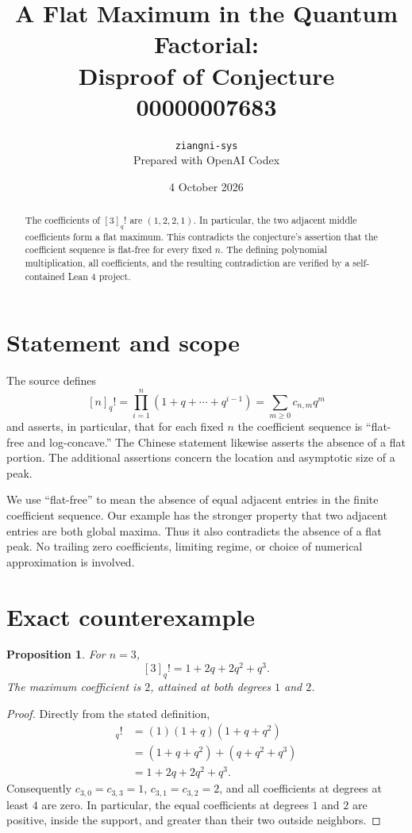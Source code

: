 \documentclass[11pt]{article}
\title{A Flat Maximum in the Quantum Factorial:\\Disproof of Conjecture 00000007683}
\author{\texttt{ziangni-sys}\\\small Prepared with OpenAI Codex}
\date{4 October 2026}
\newtheorem{proposition}{Proposition}
\begin{document}
\maketitle

\begin{abstract}
The coefficients of $[3]_q!$ are $(1,2,2,1)$. In particular, the two adjacent
middle coefficients form a flat maximum. This contradicts the conjecture's
assertion that the coefficient sequence is flat-free for every fixed $n$.
The defining polynomial multiplication, all coefficients, and the resulting
contradiction are verified by a self-contained Lean 4 project.
\end{abstract}

\section{Statement and scope}
The source defines
\[
 [n]_q! = \prod_{i=1}^{n}(1+q+\cdots+q^{i-1})
         = \sum_{m\geq 0} c_{n,m}q^m
\]
and asserts, in particular, that for each fixed $n$ the coefficient sequence
is ``flat-free and log-concave.'' The Chinese statement likewise asserts the
absence of a flat portion. The additional assertions concern the location
and asymptotic size of a peak.

We use ``flat-free'' to mean the absence of equal adjacent entries in the
finite coefficient sequence. Our example has the stronger property that
two adjacent entries are both global maxima. Thus it also contradicts the
absence of a flat peak. No trailing zero coefficients, limiting regime, or
choice of numerical approximation is involved.

\section{Exact counterexample}
\begin{proposition}
For $n=3$,
\[
 [3]_q! = 1+2q+2q^2+q^3.
\]
The maximum coefficient is $2$, attained at both degrees $1$ and $2$.
\end{proposition}
\begin{proof}
Directly from the stated definition,
\begin{align*}
 [3]_q! &= (1)(1+q)(1+q+q^2)\\
 &= (1+q+q^2)+(q+q^2+q^3)\\
 &= 1+2q+2q^2+q^3.
\end{align*}
Consequently $c_{3,0}=c_{3,3}=1$, $c_{3,1}=c_{3,2}=2$, and all
coefficients at degrees at least $4$ are zero. In particular, the equal
coefficients at degrees $1$ and $2$ are positive, inside the support,
and greater than their two outside neighbors.
\end{proof}
\end{document}
